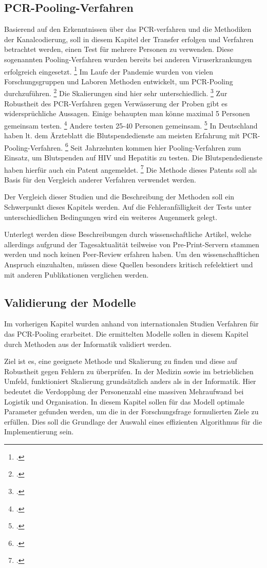 \subsection{PCR-Pooling-Verfahren}
Basierend auf den Erkenntnissen über das PCR-verfahren und die Methodiken der Kanalcodierung, soll in diesem Kapitel der Transfer erfolgen und Verfahren betrachtet werden, einen Test für mehrere Personen zu verwenden.
Diese sogenannten Pooling-Verfahren wurden bereits bei anderen Viruserkrankungen erfolgreich eingesetzt.
\footcite{Ärzteblatt}
Im Laufe der Pandemie wurden von vielen Forschungsgruppen und Laboren Methoden entwickelt, um PCR-Pooling durchzuführen.
\footcite{Reddit Quelle}
Die Skalierungen sind hier sehr unterschiedlich.
\footcite{Alternative Quelle Pooling}
Zur Robustheit des PCR-Verfahren gegen Verwässerung der Proben gibt es widersprüchliche Aussagen.
Einige behaupten man könne maximal 5 Personen gemeinsam testen.
\footcite{Quelle}
Andere testen 25-40 Personen gemeinsam.
\footcite{Quelle}
In Deutschland haben lt. dem Ärzteblatt die Blutspendedienste am meisten Erfahrung mit PCR-Pooling-Verfahren.
\footcite{Ärzteblatt}
Seit Jahrzehnten kommen hier Pooling-Verfahren zum Einsatz, um Blutspenden auf HIV und Hepatitis zu testen.
Die Blutspendedienste haben hierfür auch ein Patent angemeldet.
\footcite{Patent Blutspende}
Die Methode dieses Patents soll als Basis für den Vergleich anderer Verfahren verwendet werden.

Der Vergleich dieser Studien und die Beschreibung der Methoden soll ein Schwerpunkt dieses Kapitels werden.
Auf die Fehleranfälligkeit der Tests unter unterschiedlichen Bedingungen wird ein weiteres Augenmerk gelegt.

Unterlegt werden diese Beschreibungen durch wissenschaftliche Artikel, welche allerdings aufgrund der Tagesaktualität teilweise von Pre-Print-Servern stammen werden und noch keinen Peer-Review erfahren haben.
Um den wissenschafltichen Anspruch einzuhalten, müssen diese Quellen besonders kritisch refelektiert und mit anderen Publikationen verglichen werden.

\subsection{Validierung der Modelle}
Im vorherigen Kapitel wurden anhand von internationalen Studien Verfahren für das PCR-Pooling erarbeitet.
Die ermittelten Modelle sollen in diesem Kapitel durch Methoden aus der Informatik validiert werden.

Ziel ist es, eine geeignete Methode und Skalierung zu finden und diese auf Robustheit gegen Fehlern zu überprüfen.
In der Medizin sowie im betrieblichen Umfeld, funktioniert Skalierung grundsätzlich anders als in der Informatik.
Hier bedeutet die Verdopplung der Personenzahl eine massiven Mehraufwand bei Logistik und Organisation.
In diesem Kapitel sollen für das Modell optimale Parameter gefunden werden, um die in der Forschungsfrage formulierten Ziele zu erfüllen.
Dies soll die Grundlage der Auswahl eines effizienten Algorithmus für die Implementierung sein.

